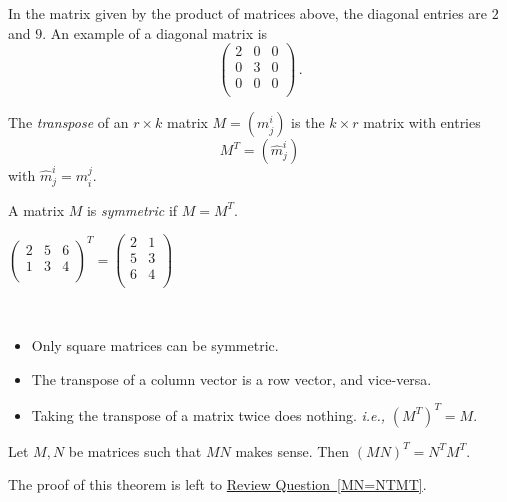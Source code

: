 In the matrix given by the product of matrices  above, the diagonal entries are $2$ and $9$.
An example of a diagonal matrix is 
\[\begin{pmatrix}
2 & 0 & 0\\
0 & 3 & 0\\
0 & 0 & 0\\
\end{pmatrix}\, .\]

\begin{definition}
The \emph{transpose} of an $r\times k$ matrix $M = (m_j^i)$ is the $k\times r$ matrix with entries
\[
M^T = (\hat{m}_j^i)
\]
with $\hat{m}_j^i = m_i^j$. 

A matrix $M$ is \emph{symmetric} if $M=M^T$.
\end{definition}

\begin{example}
$\begin{pmatrix}
2 & 5 & 6\\
1 & 3 & 4\\
\end{pmatrix}^T = 
\begin{pmatrix}
2 & 1 \\
5 & 3 \\
6 & 4 \\
\end{pmatrix}$
\end{example}


\begin{remark}[Observations]

$\phantom{test}$

\begin{itemize}
\item Only square matrices can be symmetric.

\item The transpose of a column vector is a row vector, and vice-versa. 

\item Taking the transpose of a matrix twice does nothing.  \emph{i.e.,} $(M^T)^T=M$.
\end{itemize}
\end{remark}

\begin{theorem}
Let $M, N$ be matrices such that $MN$ makes sense.  Then $(MN)^T = N^TM^T$.
\end{theorem}
The proof of this theorem is left to \hyperref[MN=NTMT]{Review Question~\ref*{MN=NTMT}}.


